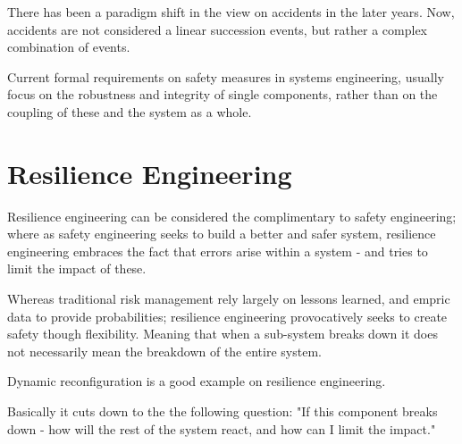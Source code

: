 There has been a paradigm shift in the view on accidents in the later years. Now, accidents are not considered a linear succession events, but rather a complex combination of events.




Current formal requirements on safety measures in systems engineering, usually focus on the robustness and integrity of single components, rather than on the coupling of these and the system as a whole.
\section{Resilience Engineering}
\label{sec:resilience_engineering}
Resilience engineering can be considered the complimentary to safety engineering; where as safety engineering seeks to build a better and safer system, resilience engineering embraces the fact that errors arise within a system - and tries to limit the impact of these.

Whereas traditional risk management rely largely on lessons learned, and empric data to provide probabilities; resilience engineering provocatively seeks to create safety though flexibility. Meaning that when a sub-system breaks down it does not necessarily mean the breakdown of the entire system.

Dynamic reconfiguration is a good example on resilience engineering.

Basically it cuts down to the the following question: "If this component breaks down - how will the rest of the system react, and how can I limit the impact."


